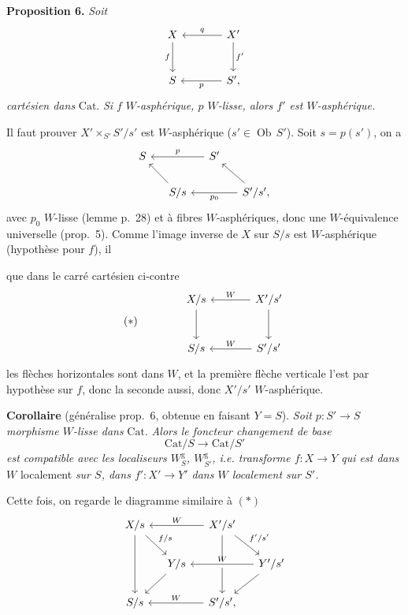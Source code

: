 \documentclass[11pt]{article}
\newcommand{\printedpage}[1]{\marginpar{\footnotesize p.~#1}}
\newcommand{\msp}[1]{\marginpar{\footnotesize [#1]}}
\newcommand{\Cat}{\mathrm{Cat}}
\newcommand{\Ob}{\operatorname{Ob}}
\begin{document}
\printedpage{25}
\textbf{Proposition 6.} \textit{Soit}
\[
\begin{tikzcd}[row sep=large, column sep=large]
X & X' \arrow[l, "q"'] \arrow[d, "f'"] \\
S \arrow[from=u, "f"'] & S', \arrow[l, "p"]
\end{tikzcd}
\]
\textit{cartésien dans} $\Cat$. \textit{Si $f$} \textit{$W$-asphérique, $p$ $W$-lisse, alors $f'$ est $W$-asphérique.}

Il faut prouver $X'\times_{S'}S'/s'$ est $W$-asphérique ($s'\in\Ob\,S'$). Soit $s=p(s')$, on a
\[
\begin{tikzcd}[column sep=small]
S & & S' \arrow[ll, "p"'] & \\
& S/s \arrow[ul] & & S'/s', \arrow[ul] \arrow[ll, "p_0"]
\end{tikzcd}
\]
avec $p_0$ $W$-lisse (lemme p.~28) et à fibres $W$-asphériques, donc une $W$-équivalence universelle (prop.~5). Comme l'image inverse de $X$ sur $S/s$ est $W$-asphérique (hypothèse pour $f$), il

\leavevmode\msp{page 32}que dans le carré cartésien ci-contre
\[
(*)\qquad\qquad
\begin{tikzcd}[row sep=large, column sep=large]
X/s \arrow[d] & X'/s' \arrow[l, "W"'] \arrow[d] \\
S/s & S'/s' \arrow[l, "W"']
\end{tikzcd}
\]
les flèches horizontales sont dans $W$, et la première flèche verticale l'est par hypothèse sur $f$, donc la seconde aussi, donc $X'/s'$ $W$-asphérique.

\textbf{Corollaire} (généralise prop.~6, obtenue en faisant $Y=S$). \textit{Soit $p : S'\longrightarrow S$} \textit{morphisme $W$-lisse dans} $\Cat$. \textit{Alors le foncteur changement de base}
\[
\Cat/S\longrightarrow\Cat/S'
\]
\textit{est compatible avec les localiseurs $W^{\mathrm{g}}_S$, $W^{\mathrm{g}}_{S'}$, i.e. transforme $f : X\longrightarrow Y$ qui est dans $W$} localement \textit{sur $S$, dans $f' : X'\longrightarrow Y'$ dans $W$ localement sur $S'$.}

Cette fois, on regarde le diagramme similaire à $(*)$
\[
\begin{tikzcd}[column sep=small]
X/s \arrow[dd] \arrow[dr, "f/s"] & & X'/s' \arrow[ll, "W"'] \arrow[dd] \arrow[dr, "f'/s'"] & \\
& Y/s \arrow[dl] & & Y'/s' \arrow[ll, "W"', crossing over] \arrow[dl] \\
S/s & & S'/s', \arrow[ll, "W"'] &
\end{tikzcd}
\]
\end{document}
